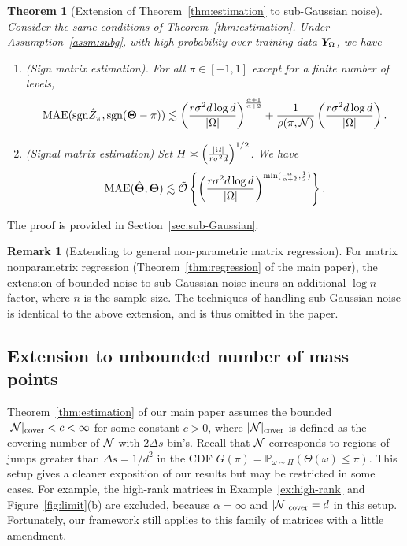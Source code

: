 \documentclass[11pt]{article}
\theoremstyle{plain}
\newtheorem{thm}{Theorem}[subsection]
\theoremstyle{definition}
\newtheorem{rmk}{Remark}
\def\sign{\textup{sgn}}
\begin{document}
\begin{thm}[Extension of Theorem~\ref{thm:estimation} to sub-Gaussian noise]\label{thm:extension_gaussian} Consider the same conditions of Theorem~\ref{thm:estimation}. Under Assumption~\ref{assm:subg}, with high probability over training data $\bm Y_{\Omega}$, we have
\begin{enumerate}
\item [(a)](Sign matrix estimation). For all $\pi\in [-1,1]$ except for a finite number of levels,
\begin{equation}\label{eq:matrix_sign}
 \textup{MAE}(\sign \hat Z_\pi,\sign (\mTheta-\pi))\lesssim \left({r \sigma^2d\log d \over |\Omega|}\right)^{\alpha+1\over \alpha+2}+{1\over \rho(\pi,\tN)}\left({r \sigma^2d\log d \over |\Omega|}\right).
\end{equation}
\item [(b)](Signal matrix estimation) Set $H\asymp \left({ |\Omega|\over r \sigma^2d}\right)^{1/2}$. We have
\[
 \textup{MAE}(\hat {\bm{\Theta}},\bm{\Theta})\lesssim \tilde {\mathcal{O}}\left\{\left({r \sigma^2d\log d\over |\Omega|}\right)^{\min({\alpha\over\alpha+2},\frac{1}{2})}\right\}.
\]
\end{enumerate}
\end{thm}
The proof is provided in Section~\ref{sec:sub-Gaussian}.  

\begin{rmk}[Extending to general non-parametric matrix regression] For matrix nonparametrix regression (Theorem~\ref{thm:regression} of the main paper), the extension of bounded noise to sub-Gaussian noise incurs an additional $\log n$ factor, where $n$ is the sample size. The techniques of handling sub-Gaussian noise is identical to the above extension, and is thus omitted in the paper. 
\end{rmk}

\subsection{Extension to unbounded number of mass points}\label{sec:unbounded}
Theorem~\ref{thm:estimation} of our main paper assumes the bounded $|\mathcal{N}|_{\text{cover}}<c<\infty$ for some constant $c>0$, where $|\mathcal{N}|_{\text{cover}}$ is defined as the covering number of $\mathcal{N}$ with $2\Delta s$-bin's. Recall that $\mathcal{N}$ corresponds to regions of jumps greater than $\Delta s = {1/d^2}$ in the CDF $G(\pi)=\mathbb{P}_{\omega\sim \Pi}(\Theta(\omega)\leq \pi)$. This setup gives a cleaner exposition of our results but may be restricted in some cases. For example, the high-rank matrices in Example~\ref{ex:high-rank} and Figure~\ref{fig:limit}(b) are excluded, because $\alpha=\infty$ and $|\mathcal{N}|_{\text{cover}}=d$ in this setup. Fortunately, our framework still applies to this family of matrices with a little amendment. 
\end{document}
